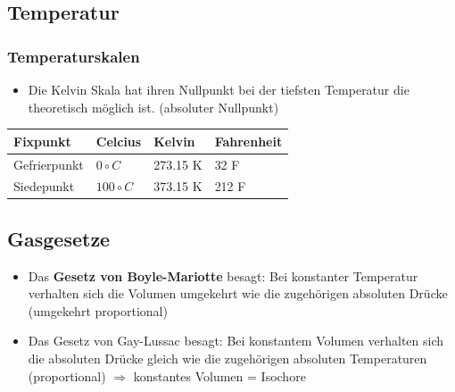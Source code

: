 \documentclass[
a4paper,
oneside,
landscape, 
8pt,
]{scrartcl}
\begin{document}
\begin{multicols*}{2}
\subsection{Temperatur}

\subsubsection{Temperaturskalen}
\begin{itemize}
	\item Die Kelvin Skala hat ihren Nullpunkt bei der tiefsten Temperatur die theoretisch möglich ist. (absoluter Nullpunkt)
\end{itemize}
\begin{tabbing}
\begin{tabu} to \linewidth {l l l X}
	\toprule
	Fixpunkt & Celcius & Kelvin & Fahrenheit \\
	\midrule
	Gefrierpunkt & $0 \circ C$ & 273.15 K &	32 F \\
	Siedepunkt & $100 \circ C$ & 373.15 K &	212 F \\
	\bottomrule
\end{tabu}
\end{tabbing}

\vfill\null
\columnbreak

\subsection{Gasgesetze}
\begin{itemize}
	\item Das \textbf{Gesetz von Boyle-Mariotte} besagt: Bei konstanter Temperatur verhalten sich die Volumen umgekehrt wie die zugehörigen absoluten Drücke (umgekehrt proportional)
	\item Das Gesetz von Gay-Lussac besagt: Bei konstantem Volumen verhalten sich die absoluten Drücke gleich wie die zugehörigen absoluten Temperaturen (proportional) $\Rightarrow$ konstantes Volumen = Isochore
\end{itemize}


\end{multicols*}
\end{document}
